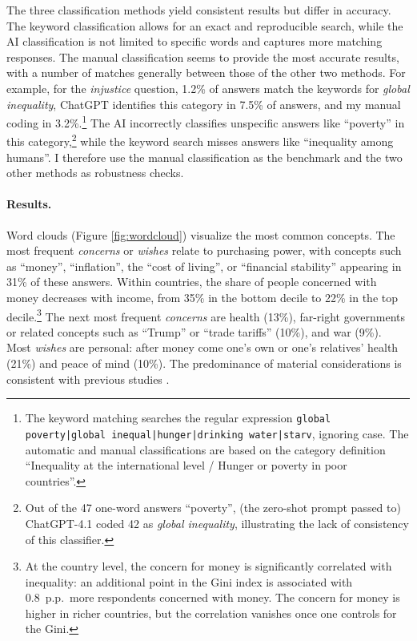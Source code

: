 \documentclass[12pt,english]{article}
\begin{document}
The three classification methods yield consistent results but differ in accuracy. The keyword classification allows for an exact and reproducible search, while the AI classification is not limited to specific words and captures more matching responses. The manual classification seems to provide the most accurate results, with a number of matches generally between those of the other two methods. For example, for the \textit{injustice} question, 1.2\% of answers match the keywords for \textit{global inequality}, ChatGPT identifies this category in 7.5\% of answers, and my manual coding in 3.2\%.\footnote{The keyword matching searches the regular expression \texttt{global poverty\allowbreak|global inequal\allowbreak|hunger|drinking water|starv}, ignoring case. The automatic and manual classifications are based on the category definition ``Inequality at the international level / Hunger or poverty in poor countries''.} The AI incorrectly classifies unspecific answers like ``poverty'' in this category,\footnote{Out of the 47 one-word answers ``poverty'', (the zero-shot prompt passed to) ChatGPT-4.1 coded 42 as \textit{global inequality}, illustrating the lack of consistency of this classifier.} while the keyword search misses answers like ``inequality among humans''. I therefore use the manual classification as the benchmark and the two other methods as robustness checks.

\paragraph{Results.} Word clouds (Figure \ref{fig:wordcloud}) visualize the most common concepts. The most frequent \textit{concerns} or \textit{wishes} relate to purchasing power, with concepts such as ``money'', ``inflation'', the ``cost of living'', or ``financial stability'' appearing in 31\% of these answers. Within countries, the share of people concerned with money decreases with income, from 35\% in the bottom decile to 22\% in the top decile.\footnote{At the country level, the concern for money is significantly correlated with inequality: an additional point in the Gini index is associated with 0.8~p.p.\ more respondents concerned with money. The concern for money is higher in richer countries, but the correlation vanishes once one controls for the Gini.} The next most frequent \textit{concerns} are health (13\%), far-right governments or related concepts such as ``Trump'' or ``trade tariffs'' (10\%), and war (9\%). Most \textit{wishes} are personal: after money come one's own or one's relatives' health (21\%) and peace of mind (10\%). The predominance of material considerations is consistent with previous studies \citep{wlezien_salience_2005,singer_who_2011}.
\end{document}

